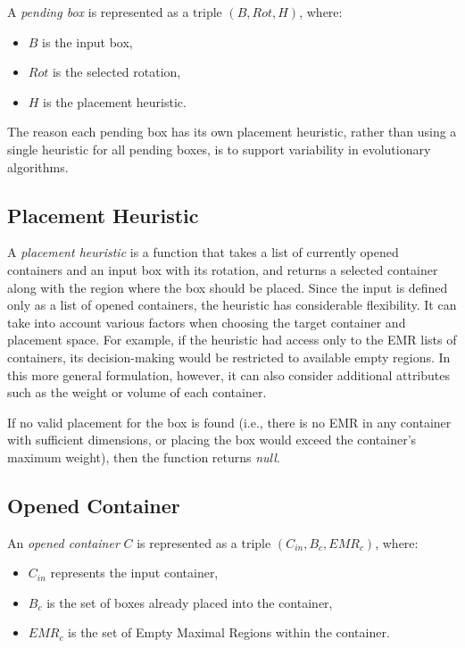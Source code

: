 A \emph{pending box} is represented as a triple $(B, Rot, H)$, where:
\begin{itemize}
    \item $B$ is the input box,
    \item $Rot$ is the selected rotation,
    \item $H$ is the placement heuristic.
\end{itemize}

The reason each pending box has its own placement heuristic, rather than using a single heuristic for all pending boxes, is to support variability in evolutionary algorithms.

\subsection{Placement Heuristic}

A \emph{placement heuristic} is a function that takes a list of currently opened containers and an input box with its rotation, 
and returns a selected container along with the region where the box should be placed.
Since the input is defined only as a list of opened containers, 
the heuristic has considerable flexibility. It can take into account various factors when choosing the target container and placement space. 
For example, if the heuristic had access only to the EMR lists of containers, 
its decision-making would be restricted to available empty regions. 
In this more general formulation, however, it can also consider additional attributes such as the weight or volume of each container.

If no valid placement for the box is found (i.e., there is no EMR in any container with sufficient dimensions, or placing the box would exceed the container's maximum weight), 
then the function returns \textit{null}.

\subsection{Opened Container}

An \emph{opened container} $C$ is represented as a triple $(C_{in}, B_c, EMR_c)$, where:
\begin{itemize}
    \item $C_{in}$ represents the input container,
    \item $B_c$ is the set of boxes already placed into the container,
    \item $EMR_c$ is the set of Empty Maximal Regions within the container.
\end{itemize}


